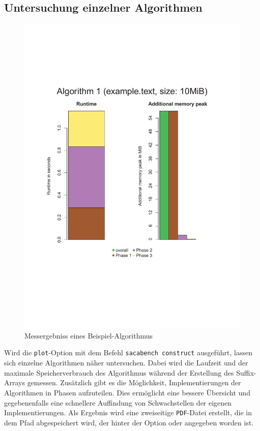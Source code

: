 \subsection{Untersuchung einzelner Algorithmen}
\label{framework:bechmark:sacabench-construct}

\begin{figure}
	\includegraphics[page = 1, width=.5\textwidth]{kapitel/3_framework/benchmark/sacabench-construct/beispiel_construct.pdf}
	\caption{Messergebniss eines Beispiel-Algorithmus}
	\label{pdf:benchmark:construct}
\end{figure}


Wird die \texttt{plot}-Option mit dem Befehl \texttt{sacabench construct} ausgeführt, lassen sich einzelne Algorithmen näher untersuchen. Dabei wird die Laufzeit und der maximale Speicherverbrauch des Algorithmus während der Erstellung des Suffix-Arrays gemessen. Zusätzlich gibt es die Möglichkeit, Implementierungen der Algorithmen in Phasen aufzuteilen. Dies ermöglicht eine bessere Übersicht und gegebenenfalls eine schnellere Auffindung von Schwachstellen der eigenen Implementierungen.
Als Ergebnis wird eine zweiseitige \texttt{PDF}-Datei erstellt, die in dem Pfad abgespeichert wird, der hinter der Option  oder  angegeben worden ist.

